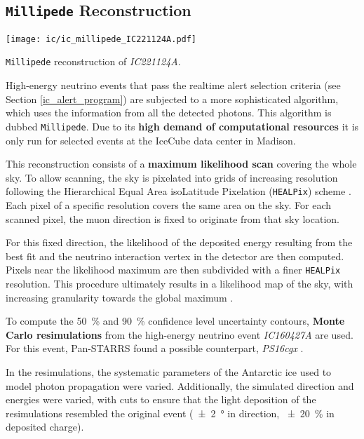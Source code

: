 \subsection{\texttt{Millipede} Reconstruction} \label{millipede}

\begin{marginfigure}
    \texttt{[image: ic/ic\_millipede\_IC221124A.pdf]}
    \caption[\texttt{Millipede} reconstruction of \emph{IC221124A}]{\texttt{Millipede} reconstruction of \emph{IC221124A}.}
\end{marginfigure}

High-energy neutrino events that pass the realtime alert selection criteria (see Section \ref{ic_alert_program}) are subjected to a more sophisticated algorithm, which uses the information from all the detected photons. This algorithm is dubbed \texttt{Millipede}. Due to its \textbf{high demand of computational resources} it is only run for selected events at the IceCube data center in Madison.

This reconstruction consists of a \textbf{maximum likelihood scan} covering the whole sky. To allow scanning, the sky is pixelated into grids of increasing resolution following the Hierarchical Equal Area isoLatitude Pixelation (\texttt{HEALPix}) scheme . Each pixel of a specific resolution covers the same area on the sky. For each scanned pixel, the muon direction is fixed to originate from that sky location.

For this fixed direction, the likelihood of the deposited energy resulting from the best fit and the neutrino interaction vertex in the detector are then computed. Pixels near the likelihood maximum are then subdivided with a finer \texttt{HEALPix} resolution. This procedure ultimately results in a likelihood map of the sky, with increasing granularity towards the global maximum .

To compute the \SI{50}{\percent} and \SI{90}{\percent} confidence level uncertainty contours, \textbf{Monte Carlo resimulations} from the high-energy neutrino event \emph{IC160427A} are used. For this event, Pan-STARRS found a possible counterpart, \emph{PS16cgx} .

In the resimulations, the systematic parameters of the Antarctic ice used to model photon propagation were varied. Additionally, the simulated direction and energies were varied, with cuts to ensure that the light deposition of the resimulations resembled the original event (\SI{\pm 2}{\degree} in direction, \SI{\pm 20}{\percent} in deposited charge).


